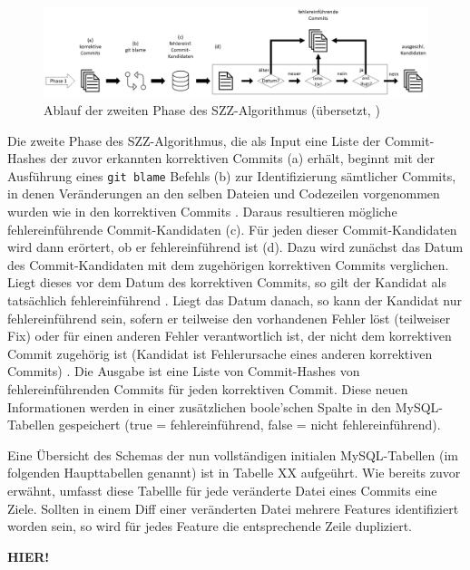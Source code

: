 \begin{figure}[]
    \centering
    \includegraphics[width=\textwidth]{images/SZZ}
    \caption{Ablauf der zweiten Phase des SZZ-Algorithmus (übersetzt, \cite{Borg2019})\label{fig:szz}}
\end{figure}

Die zweite Phase des SZZ-Algorithmus, die als Input eine Liste der Commit-Hashes der zuvor erkannten korrektiven Commits (a) erhält, beginnt mit der Ausführung eines \texttt{git blame} Befehls (b) zur Identifizierung sämtlicher Commits, in denen Veränderungen an den selben Dateien und Codezeilen vorgenommen wurden wie in den korrektiven Commits \cite{Borg2019}. Daraus resultieren mögliche fehlereinführende Commit-Kandidaten (c). Für jeden dieser Commit-Kandidaten wird dann erörtert, ob er fehlereinführend ist (d). Dazu wird zunächst das Datum des Commit-Kandidaten mit dem zugehörigen korrektiven Commits verglichen. Liegt dieses vor dem Datum des korrektiven Commits, so gilt der Kandidat als tatsächlich fehlereinführend \cite{Borg2019}. Liegt das Datum danach, so kann der Kandidat nur fehlereinführend sein, sofern er teilweise den vorhandenen Fehler löst (teilweiser Fix) oder für einen anderen Fehler verantwortlich ist, der nicht dem korrektiven Commit zugehörig ist (Kandidat ist Fehlerursache eines anderen korrektiven Commits) \cite{Borg2019}. Die Ausgabe ist eine Liste von Commit-Hashes von fehlereinführenden Commits für jeden korrektiven Commit. Diese neuen Informationen werden in einer zusätzlichen boole'schen Spalte in den MySQL-Tabellen gespeichert (true = fehlereinführend, false = nicht fehlereinführend). 

Eine Übersicht des Schemas der nun vollständigen initialen  MySQL-Tabellen (im folgenden Haupttabellen genannt) ist in Tabelle XX aufgeührt. Wie bereits zuvor erwähnt, umfasst diese Tabellle für jede veränderte Datei eines Commits eine Ziele. Sollten in einem Diff einer veränderten Datei mehrere Features identifiziert worden sein, so wird für jedes Feature die entsprechende Zeile dupliziert.

\textbf{HIER!}

